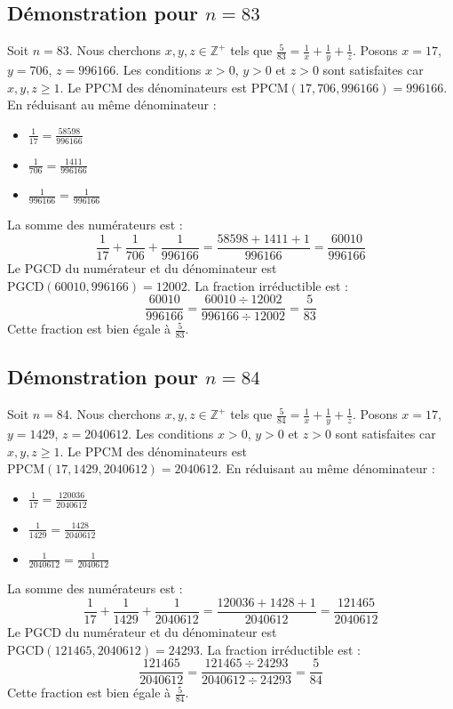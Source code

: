 \documentclass[11pt,a4paper]{article}
\begin{document}
\subsection{Démonstration pour $n = 83$}
Soit $n = 83$. Nous cherchons $x, y, z \in \mathbb{Z}^{+}$ tels que $\frac{5}{83} = \frac{1}{x} + \frac{1}{y} + \frac{1}{z}$.
Posons $x = 17$, $y = 706$, $z = 996166$.
Les conditions $x > 0$, $y > 0$ et $z > 0$ sont satisfaites car $x, y, z \geq 1$.
Le PPCM des dénominateurs est $\text{PPCM}(17, 706, 996166) = 996166$.
En réduisant au même dénominateur :
\begin{itemize}
    \item $\frac{1}{17} = \frac{58598}{996166}$
    \item $\frac{1}{706} = \frac{1411}{996166}$
    \item $\frac{1}{996166} = \frac{1}{996166}$
\end{itemize}
La somme des numérateurs est :
$$ \frac{1}{17} + \frac{1}{706} + \frac{1}{996166} = \frac{58598 + 1411 + 1}{996166} = \frac{60010}{996166} $$
Le PGCD du numérateur et du dénominateur est $\text{PGCD}(60010, 996166) = 12002$.
La fraction irréductible est :
$$ \frac{60010}{996166} = \frac{60010 \div 12002}{996166 \div 12002} = \frac{5}{83} $$
Cette fraction est bien égale à $\frac{5}{83}$.

\subsection{Démonstration pour $n = 84$}
Soit $n = 84$. Nous cherchons $x, y, z \in \mathbb{Z}^{+}$ tels que $\frac{5}{84} = \frac{1}{x} + \frac{1}{y} + \frac{1}{z}$.
Posons $x = 17$, $y = 1429$, $z = 2040612$.
Les conditions $x > 0$, $y > 0$ et $z > 0$ sont satisfaites car $x, y, z \geq 1$.
Le PPCM des dénominateurs est $\text{PPCM}(17, 1429, 2040612) = 2040612$.
En réduisant au même dénominateur :
\begin{itemize}
    \item $\frac{1}{17} = \frac{120036}{2040612}$
    \item $\frac{1}{1429} = \frac{1428}{2040612}$
    \item $\frac{1}{2040612} = \frac{1}{2040612}$
\end{itemize}
La somme des numérateurs est :
$$ \frac{1}{17} + \frac{1}{1429} + \frac{1}{2040612} = \frac{120036 + 1428 + 1}{2040612} = \frac{121465}{2040612} $$
Le PGCD du numérateur et du dénominateur est $\text{PGCD}(121465, 2040612) = 24293$.
La fraction irréductible est :
$$ \frac{121465}{2040612} = \frac{121465 \div 24293}{2040612 \div 24293} = \frac{5}{84} $$
Cette fraction est bien égale à $\frac{5}{84}$.
\end{document}
